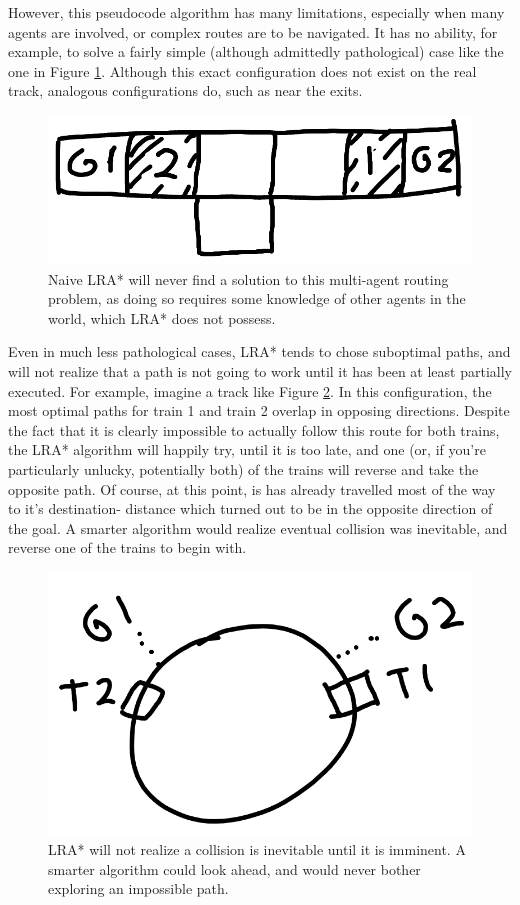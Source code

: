 \documentclass{article}
\begin{document}
However, this pseudocode algorithm has many limitations, especially when many
agents are involved, or complex routes are to be navigated. It has no ability,
for example, to solve a fairly simple (although admittedly pathological) case
like the one in Figure \ref{fig:LRA*-unsolveable}. Although this exact
configuration does not exist on the real track, analogous configurations do,
such as near the exits.
\begin{figure}
\caption{Naive LRA* will never find a solution to this multi-agent routing
problem, as doing so requires some knowledge of other agents in the world,
which LRA* does not possess.}
\label{fig:LRA*-unsolveable}
\includegraphics[width=\linewidth]{LRA*-unsolveable.png}
\end{figure}

Even in much less pathological cases, LRA* tends to chose suboptimal paths,
and will not realize that a path is not going to work until it has been at
least partially executed. For example, imagine a track like
Figure \ref{fig:LRA*-suboptimal}. In this configuration, the most optimal
paths for train 1 and train 2 overlap in opposing directions. Despite the
fact that it is clearly impossible to actually follow this route for both
trains, the LRA* algorithm will happily try, until it is too late, and one
(or, if you're particularly unlucky, potentially both) of the trains will
reverse and take the opposite path. Of course, at this point, is has already
travelled most of the way to it's destination- distance which turned out to
be in the opposite direction of the goal. A smarter algorithm would realize
eventual collision was inevitable, and reverse one of the trains to begin with.
\begin{figure}
\caption{LRA* will not realize a collision is inevitable until it is imminent.
A smarter algorithm could look ahead, and would never bother exploring an
impossible path.}
\label{fig:LRA*-suboptimal}
\includegraphics[width=\linewidth]{LRA*-suboptimal.png}
\end{figure}
\end{document}
